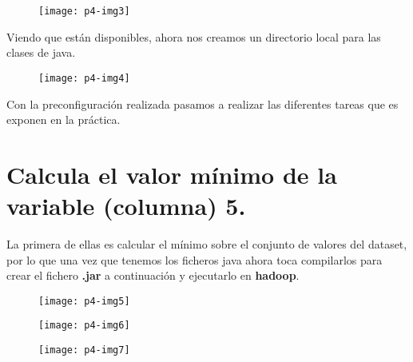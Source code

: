 \documentclass[10pt]{article}
\begin{document}
 \begin{figure}[H]
	\begin{center}
 		\texttt{[image: p4-img3]}
	\end{center} 
\end{figure}

Viendo que están disponibles, ahora nos creamos un directorio local para las clases de java. \\

 \begin{figure}[H]
	\begin{center}
 		\texttt{[image: p4-img4]}
	\end{center} 
\end{figure}

Con la preconfiguración realizada pasamos a realizar las diferentes tareas que es exponen en la práctica. \\


\section{Calcula el valor mínimo de la variable (columna) 5.} 

La primera de ellas es calcular el mínimo sobre el conjunto de valores del dataset, por lo que una vez que tenemos los ficheros java ahora toca compilarlos para crear el fichero \textbf{.jar} a continuación y ejecutarlo en \textbf{hadoop}.\\

\begin{figure}[H]
	\begin{center}
 		\texttt{[image: p4-img5]}
	\end{center} 
\end{figure}

\begin{figure}[H]
	\begin{center}
 		\texttt{[image: p4-img6]}
	\end{center} 
\end{figure}

\begin{figure}[H]
	\begin{center}
 		\texttt{[image: p4-img7]}
	\end{center} 
\end{figure}
\end{document}
